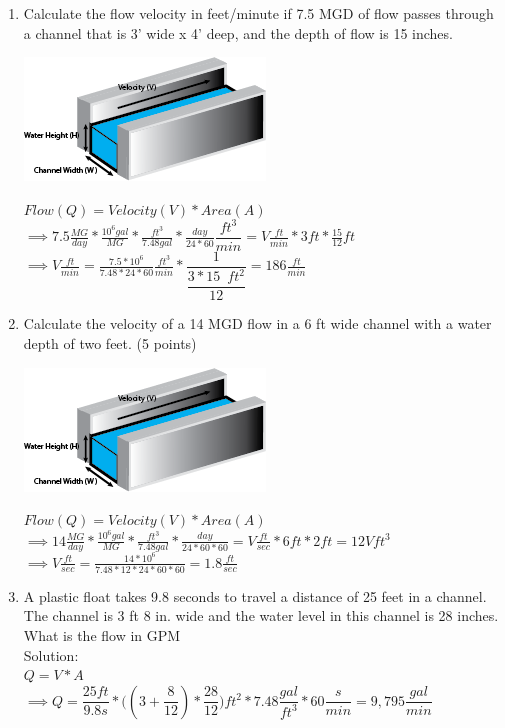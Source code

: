 \documentclass{article}
\begin{document}
\begin{enumerate}
\item Calculate the flow velocity in feet/minute if 7.5 MGD of flow passes through a channel that is 3' wide x 4' deep, and the depth of flow is 15 inches.
\begin{center}
\includegraphics[scale=1.1]{ChannelFlow1}
\end{center}
$Flow (Q) = Velocity (V) * Area (A)$\\
\vspace{0.3cm}
$\implies 7.5 \frac{MG}{day}* \frac{10^6 gal}{MG} * \frac{ft^3}{7.48 gal}*\frac{day}{24*60} \dfrac{ft^3}{min} = V \frac{ft}{min}* 3 ft * \frac{15}{12} ft$\\
\vspace{0.3cm}
$\implies V \frac{ft}{min}= \frac{7.5* 10^6}{7.48*24*60}\frac{ft^3}{min}*\dfrac{1}{\dfrac{3*15\enspace ft^2}{12}}= \boxed{186\frac{ft}{min}}$\\
\vspace {8mm}

\item Calculate the velocity of a 14 MGD flow in a 6 ft wide channel with a water depth of two feet. (5 points)\\
\begin{center}
\includegraphics[scale=1.1]{ChannelFlow1}
\end{center}
$Flow (Q) = Velocity (V) * Area (A)$\\
\vspace{0.3cm}
$\implies 14 \frac{MG}{day}* \frac{10^6 gal}{MG} * \frac{ft^3}{7.48 gal}*\frac{day}{24*60*60} = V \frac{ft}{sec}* 6 ft * 2 ft = 12Vft^3$\\
\vspace{0.3cm}
$\implies V \frac{ft}{sec}= \frac{14 * 10^6}{7.48 *12*24*60*60}= \boxed{1.8\frac{ft}{sec}}$\\
\vspace {8mm}

\item A plastic float takes 9.8 seconds to travel a distance of 25 feet in a channel. The channel is 3 ft 8 in. wide and the water level in this channel is 28 inches. What is the flow in GPM\\
Solution:\\
\vspace{0.3cm}
$Q=V*A$\\
\vspace{0.3cm}
$\implies Q=\dfrac{25ft}{9.8s}*\Big((3+\dfrac{8}{12})*\dfrac{28}{12}\Big)ft^2*7.48\dfrac{gal}{ft^3}*60\dfrac{s}{min}=\boxed{9,795\dfrac{gal}{min}}$




\end{enumerate}
\end{document}
